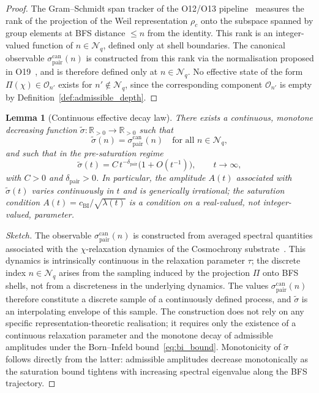 \documentclass[12pt,a4paper]{article}
\newtheorem{lemma}[theorem]{Lemma}
\theoremstyle{remark}
\newcommand{\cchi}{c_{\mathrm{BI}}}
\newcommand{\sigpair}{\sigma^{\mathrm{can}}_{\mathrm{pair}}}
\newcommand{\dpair}{\delta_{\mathrm{pair}}}
\begin{document}
    \begin{proof}
      The Gram--Schmidt span tracker of the O12/O13 pipeline~\cite{Beau2026a16,Beau2026a17}
      measures the rank of the projection of the Weil representation $\rho_c$ onto the subspace
      spanned by group elements at BFS distance $\leq n$ from the identity.
      This rank is an integer-valued function of $n \in \mathcal{N}_q$, defined only at shell
      boundaries.
      The canonical observable $\sigpair(n)$ is constructed from this rank via the normalisation
      proposed in O19~\cite{Beau2026a23}, and is therefore defined only at $n \in \mathcal{N}_q$.
      No effective state of the form $\Pi(\chi) \in \mathcal{O}_{n'}$ exists for
      $n' \notin \mathcal{N}_q$, since the corresponding component $\mathcal{O}_{n'}$ is empty
      by Definition~\ref{def:admissible_depth}.
    \end{proof}

    \begin{lemma}[Continuous effective decay law]
      \label{lem:continuous_decay}
      There exists a continuous, monotone decreasing function
      $\tilde{\sigma} : \mathbb{R}_{>0} \to \mathbb{R}_{>0}$ such that
      \begin{equation}
        \label{eq:continuous_interp}
        \tilde{\sigma}(n) = \sigpair(n) \quad \text{for all } n \in \mathcal{N}_q,
      \end{equation}
      and such that in the pre-saturation regime
      \begin{equation}
        \label{eq:continuous_decay}
        \tilde{\sigma}(t) = C \, t^{-\dpair} \bigl(1 + O(t^{-1})\bigr), \qquad t \to \infty,
      \end{equation}
      with $C > 0$ and $\dpair > 0$.
      In particular, the amplitude $A(t)$ associated with $\tilde{\sigma}(t)$ varies
      continuously in $t$ and is generically irrational; the saturation condition
      $A(t) = \cchi/\sqrt{\lambda(t)}$ is a condition on a real-valued, not
      integer-valued, parameter.
    \end{lemma}

    \begin{proof}[Sketch]
The observable $\sigpair(n)$ is constructed from averaged spectral quantities
associated with the $\chi$-relaxation dynamics of the Cosmochrony
substrate~\cite{Cosmochrony}.
This dynamics is intrinsically continuous in the relaxation parameter $\tau$;
the discrete index $n \in \mathcal{N}_q$ arises from the sampling induced by
the projection $\Pi$ onto BFS shells, not from a discreteness in the underlying
dynamics.
The values $\sigpair(n)$ therefore constitute a discrete sample of a continuously
defined process, and $\tilde{\sigma}$ is an interpolating envelope of this sample.
The construction does not rely on any specific representation-theoretic realisation;
it requires only the existence of a continuous relaxation parameter and the
monotone decay of admissible amplitudes under the Born--Infeld
bound~\eqref{eq:bi_bound}.
Monotonicity of $\tilde{\sigma}$ follows directly from the latter: admissible
amplitudes decrease monotonically as the saturation bound tightens with increasing
spectral eigenvalue along the BFS trajectory.
    \end{proof}
\end{document}
